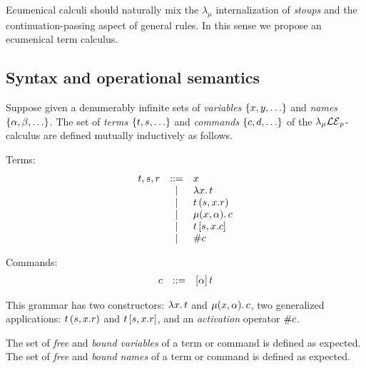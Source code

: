 
 Ecumenical calculi should naturally mix the $\lambda_\mu$ internalization of {\em stoups} 
 and the continuation-passing aspect of general rules. 
 In this sense we propose an ecumenical term calculus. 

\subsection{Syntax and operational semantics}
\begin{definition}[Syntax]
Suppose given a denumerably infinite sets 
of {\em variables} $\{x,y,\hdots\}$ 
and {\em names} $\{\alpha,\beta,\hdots\}$.
The set of {\em terms} $\{t,s,\hdots\}$
and {\em commands} $\{c,d,\hdots\}$
of the $\lambda_{\mu}\mathcal{LE}_p$-calculus are defined mutually inductively as follows.

\begin{marianaenv}
Terms:
\[
\begin{array}{lcl}
  t,s,r 
         & ::=  & x                               \\
         & \mid & \lambda x.\,t                   \\
         & \mid & t \, (s,x.r) \\ 
         & \mid & \mu(x,\alpha).\,c           \\
         & \mid & t \, [s,x.c]     \\
         & \mid & \# c
\end{array}
\]
\end{marianaenv}

Commands:
\[
\begin{array}{lcl}
  c & ::=  & [\alpha]\,t
\end{array}
\]

\begin{marianaenv}
This grammar has two constructors: $\lambda x.\,t$ and $\mu(x,\alpha).\,c$,
two generalized applications: $t \, (s,x.r)$ and $t \, [s,x.r]$,
and an {\em activation} operator $\# c$.

The set of {\em free} and {\em bound variables} of a term or command is defined as expected.
The set of {\em free} and {\em bound names} of a term or command is defined as expected.
\end{marianaenv}
\end{definition}

